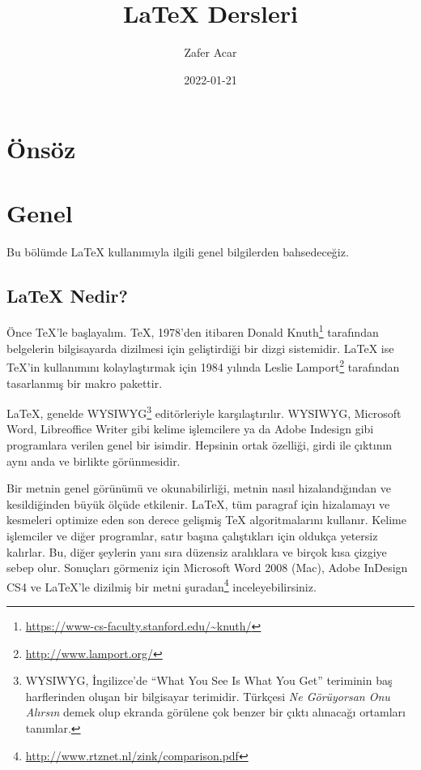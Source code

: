 \documentclass[
  10pt,
]{scrbook}
\title{LaTeX Dersleri}
\author{Zafer Acar}
\date{2022-01-21}
\renewcommand{\href}[2]{#2\footnote{\url{#1}}}
\begin{document}
\maketitle



{
\setcounter{tocdepth}{2}
\tableofcontents
}
\listoffigures
\listoftables
\hypertarget{uxf6nsuxf6z}{%
\chapter*{Önsöz}\label{uxf6nsuxf6z}}


\mainmatter

\hypertarget{genel}{%
\chapter{Genel}\label{genel}}

Bu bölümde LaTeX kullanımıyla ilgili genel bilgilerden bahsedeceğiz.

\hypertarget{latex-nedir}{%
\section{LaTeX Nedir?}\label{latex-nedir}}

Önce TeX'le başlayalım. TeX, 1978'den
itibaren \href{https://www-cs-faculty.stanford.edu/~knuth/}{Donald Knuth} tarafından belgelerin bilgisayarda dizilmesi
için geliştirdiği bir dizgi sistemidir.
LaTeX ise TeX'in kullanımını kolaylaştırmak için 1984 yılında \href{http://www.lamport.org/}{Leslie
Lamport} tarafından tasarlanmış bir makro pakettir.

LaTeX, genelde WYSIWYG\footnote{WYSIWYG, İngilizce'de ``What You See Is What You Get'' teriminin baş harflerinden oluşan bir bilgisayar terimidir. Türkçesi \emph{Ne Görüyorsan Onu Alırsın} demek olup ekranda görülene çok benzer bir çıktı alınacağı ortamları tanımlar.} editörleriyle karşılaştırılır. WYSIWYG, Microsoft
Word, Libreoffice Writer gibi kelime işlemcilere ya da Adobe Indesign
gibi programlara verilen genel bir isimdir. Hepsinin ortak özelliği,
girdi ile çıktının aynı anda ve birlikte görünmesidir.

Bir metnin genel görünümü ve okunabilirliği, metnin nasıl
hizalandığından ve kesildiğinden büyük ölçüde etkilenir. LaTeX, tüm
paragraf için hizalamayı ve kesmeleri optimize eden son derece gelişmiş
TeX algoritmalarını kullanır. Kelime işlemciler ve diğer programlar,
satır başına çalıştıkları için oldukça yetersiz kalırlar. Bu, diğer
şeylerin yanı sıra düzensiz aralıklara ve birçok kısa çizgiye sebep
olur. Sonuçları görmeniz için Microsoft Word 2008 (Mac), Adobe InDesign
CS4 ve LaTeX'le dizilmiş bir metni \href{http://www.rtznet.nl/zink/comparison.pdf}{şuradan} inceleyebilirsiniz.
\end{document}
